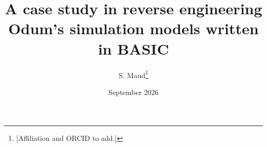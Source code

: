 \graphicspath{{../e2e/figures/}{../validation/oracle/screens/}{figures/}}



\lstset{basicstyle=\ttfamily\footnotesize, columns=fullflexible, breaklines=true, frame=single, framesep=4pt, xleftmargin=6pt}

\newif\ifdraft
\draftfalse

\ifdraft
  \newenvironment{plan}{\begin{leftbar}\small\setlength{\parskip}{0.45em}\noindent\textbf{Plan.}\ }{\end{leftbar}}
  \newcommand{\target}[1]{\par\noindent\emph{Target length: #1 words.}}
  \newcommand{\verify}{\textbf{[VERIFY]}}
\else
  \newcommand{\target}[1]{}
  \newcommand{\verify}{}
\fi

\title{A case study in reverse engineering Odum's simulation models written in BASIC}
\author{S. Maud\thanks{[Affiliation and ORCID to add.]}}
\date{September 2026}


